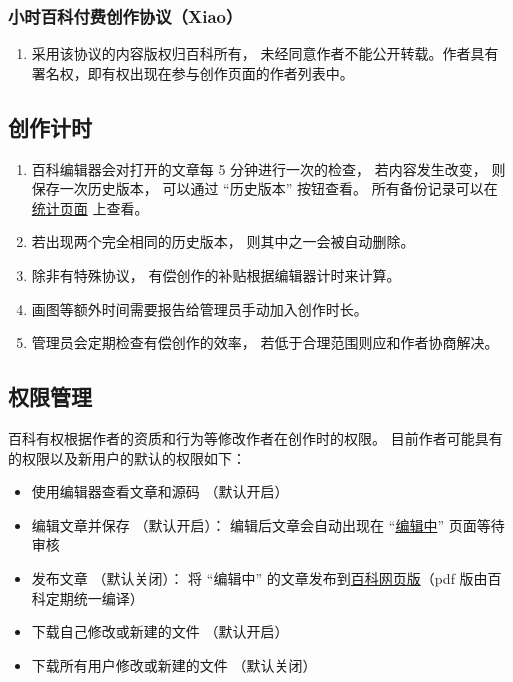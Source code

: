 \subsubsection{小时百科付费创作协议（Xiao）}
\begin{enumerate}
\item 采用该协议的内容版权归百科所有， 未经同意作者不能公开转载。作者具有署名权，即有权出现在参与创作页面的作者列表中。
\end{enumerate}

\subsection{创作计时}
\begin{enumerate}
\item 百科编辑器会对打开的文章每 5 分钟进行一次的检查， 若内容发生改变， 则保存一次历史版本， 可以通过 “历史版本” 按钮查看。 所有备份记录可以在 \href{https://wuli.wiki/editor/stat.html}{统计页面} 上查看。
\item 若出现两个完全相同的历史版本， 则其中之一会被自动删除。
\item 除非有特殊协议， 有偿创作的补贴根据编辑器计时来计算。
\item 画图等额外时间需要报告给管理员手动加入创作时长。
\item 管理员会定期检查有偿创作的效率， 若低于合理范围则应和作者协商解决。
\end{enumerate}

\subsection{权限管理}
百科有权根据作者的资质和行为等修改作者在创作时的权限。 目前作者可能具有的权限以及新用户的默认的权限如下：
\begin{itemize}
\item 使用编辑器查看文章和源码 （默认开启）
\item 编辑文章并保存 （默认开启）： 编辑后文章会自动出现在 “\href{https://wuli.wiki/changed}{编辑中}” 页面等待审核
\item 发布文章 （默认关闭）： 将 “编辑中” 的文章发布到\href{https://wuli.wiki/online}{百科网页版}（pdf 版由百科定期统一编译）
\item 下载自己修改或新建的文件 （默认开启）
\item 下载所有用户修改或新建的文件 （默认关闭）
\end{itemize}
